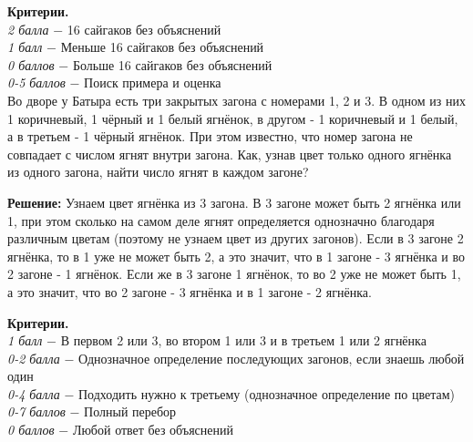 \textbf{Критерии.} \\
\textit{2 балла} $-$ 16 сайгаков без объяснений\\
\textit{1 балл} $-$ Меньше 16 сайгаков без объяснений\\
\textit{0 баллов} $-$ Больше 16 сайгаков без объяснений\\
\textit{0-5 баллов} $-$ Поиск примера и оценка\\

 Во дворе у Батыра есть три закрытых загона с номерами 1, 2 и 3. В одном из них 1 коричневый, 1 чёрный и 1 белый ягнёнок, в другом - 1 коричневый и 1 белый, а в третьем - 1 чёрный ягнёнок. При этом известно, что номер загона не совпадает с числом ягнят внутри загона. Как, узнав цвет только одного ягнёнка из одного загона, найти число ягнят в каждом загоне?

\textbf{Решение:} Узнаем цвет ягнёнка из 3 загона. В 3 загоне может быть 2 ягнёнка или 1, при этом сколько на самом деле ягнят определяется однозначно благодаря различным цветам (поэтому не узнаем цвет из других загонов). Если в 3 загоне 2 ягнёнка, то в 1 уже не может быть 2, а это значит, что в 1 загоне - 3 ягнёнка и во 2 загоне - 1 ягнёнок. Если же в 3 загоне 1 ягнёнок, то во 2 уже не может быть 1, а это значит, что во 2 загоне - 3 ягнёнка и в 1 загоне - 2 ягнёнка. 

\textbf{Критерии.} \\
\textit{1 балл} $-$ В первом 2 или 3, во втором 1 или 3 и в третьем 1 или 2 ягнёнка\\
\textit{0-2 балла} $-$ Однозначное определение последующих загонов, если знаешь любой один\\
\textit{0-4 балла} $-$ Подходить нужно к третьему (однозначное определение по цветам)\\
\textit{0-7 баллов} $-$ Полный перебор\\
\textit{0 баллов} $-$ Любой ответ без объяснений\\